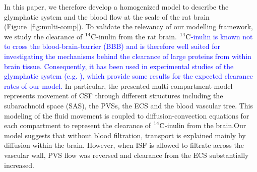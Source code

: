 \documentclass[10pt]{article}
\newcommand{\ie}{\emph{i.e.}\;}
\newcommand{\1}{^{(1)}}
\newcommand{\2}{^{(2)}}
\newcommand{\Cinulin}{$\prescript{14}{}{\text{C}}$-inulin }
\newcommand{\corr}[1]{\textcolor{blue}{#1}}
\begin{document}
In this paper, we therefore develop a homogenized model to describe the glymphatic system and the blood flow at the scale of the rat brain (Figure~\ref{fig:multi-comp}). To validate the relevancy of our modelling framework, we study the clearance of \Cinulin from the rat brain. \corr{\Cinulin is known not to cross the blood-brain-barrier (BBB) and is therefore well suited for investigating the mechanisms behind the clearance of large proteins from within brain tissue. Consequently, it has been used in experimental studies of the glymphatic system (e.g. \cite{Xie_2013_sleep, groothuis2007efflux}), which provide some results for the expected clearance rates of our model.} In particular, the presented multi-compartment model represents movement of CSF through different structures including the subarachnoid space (SAS), the PVSs, the ECS and the blood vascular tree. This modeling of the fluid movement is coupled to diffusion-convection equations for each compartment to represent the clearance of \Cinulin from the brain.Our model suggests that without blood filtration, transport is explained mainly by diffusion within the brain. However, when ISF is allowed to filtrate across the vascular wall, PVS flow was reversed and clearance from the ECS substantially increased. 
\end{document}
